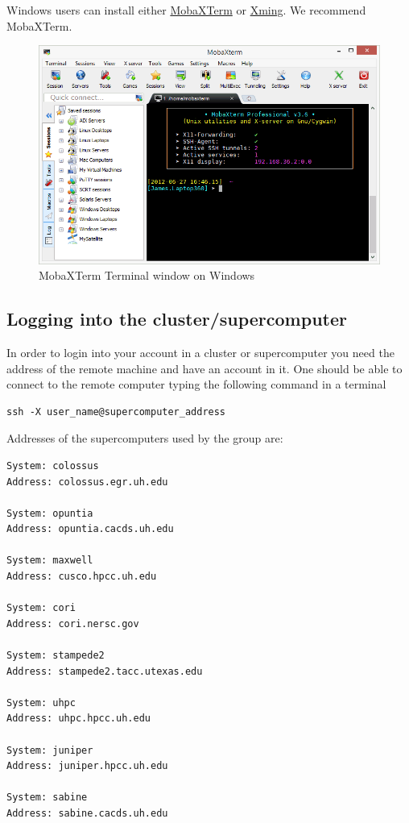 \documentclass[11pt]{article}
\begin{document}
Windows users can install either \href{http://mobaxterm.mobatek.net/}{MobaXTerm} or \href{http://www.straightrunning.com/XmingNotes/}{Xming}. We recommend MobaXTerm.
\begin{figure}[htb]
\centering
\includegraphics[width=.9\linewidth]{./figures/moba.png}
\caption{MobaXTerm Terminal window on Windows}
\end{figure}

\subsection{Logging into the cluster/supercomputer}
\label{sec-2-5}
In order to login into your account in a cluster or supercomputer you need the address of the remote machine and have an account in it. One should be able to connect to the remote computer typing the following command in a terminal
\begin{verbatim}
ssh -X user_name@supercomputer_address
\end{verbatim}

Addresses of the supercomputers used by the group are:
\begin{verbatim}
System: colossus
Address: colossus.egr.uh.edu

System: opuntia
Address: opuntia.cacds.uh.edu

System: maxwell 
Address: cusco.hpcc.uh.edu

System: cori
Address: cori.nersc.gov

System: stampede2
Address: stampede2.tacc.utexas.edu

System: uhpc
Address: uhpc.hpcc.uh.edu

System: juniper
Address: juniper.hpcc.uh.edu

System: sabine
Address: sabine.cacds.uh.edu
\end{verbatim}
\end{document}
